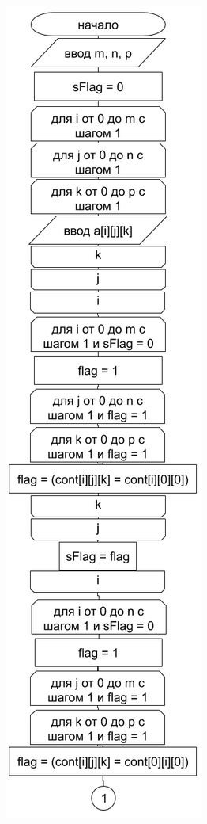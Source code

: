\documentclass[a4paper,14pt]{extarticle}
\begin{document}
\begin{center}
\includegraphics[scale=0.6]{lab4-5-1.png}\\

\end{center}
\end{document}
